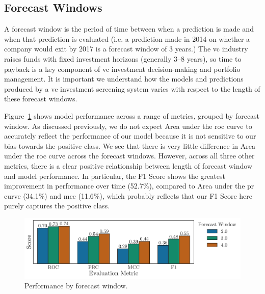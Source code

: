 \documentclass[../thesis/thesis.tex]{subfiles}
\begin{document}
\subsection{Forecast Windows}

A forecast window is the period of time between when a prediction is made and when that prediction is evaluated (i.e. a prediction made in 2014 on whether a company would exit by 2017 is a forecast window of 3 years.) The \gls{vc} industry raises funds with fixed investment horizons (generally 3--8 years), so time to payback is a key component of \gls{vc} investment decision-making and portfolio management. It is important we understand how the models and predictions produced by a \gls{vc} investment screening system varies with respect to the length of these forecast windows. 

Figure~\ref{fig:evaluation:performance_window} shows model performance across a range of metrics, grouped by forecast window. As discussed previously, we do not expect Area under the \gls{roc} curve to accurately reflect the performance of our model because it is not sensitive to our bias towards the positive class. We see that there is very little difference in Area under the \gls{roc} curve across the forecast windows. However, across all three other metrics, there is a clear positive relationship between length of forecast window and model performance. In particular, the F1 Score shows the greatest improvement in performance over time (52.7\%), compared to Area under the \gls{pr} curve (34.1\%) and \gls{mcc} (11.6\%), which probably reflects that our F1 Score here purely captures the positive class.

\begin{figure}[!htb]
    \centering
    \includegraphics[width=\textwidth]{../figures/evaluation/performance_window}
    \caption[Performance by forecast window]{Performance by forecast window.}
    \label{fig:evaluation:performance_window}
\end{figure}
\end{document}
